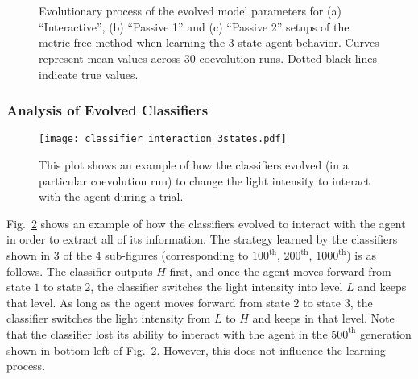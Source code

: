 \begin{figure}[!t]%
	\centering
		\\
		\\
		\caption{Evolutionary process of the evolved model parameters for (a) ``Interactive'', (b) ``Passive 1'' and (c) ``Passive 2'' setups of the metric-free method when learning the 3-state agent behavior. Curves represent mean values across 30 coevolution runs. Dotted black lines indicate true values.\label{fig:model_parameters_convergence_stochastic_3states}}
\end{figure}

\subsubsection{Analysis of Evolved Classifiers}
%
\begin{figure}[!t]
\centering
\texttt{[image: classifier\_interaction\_3states.pdf]}
\caption{This plot shows an example of how the classifiers evolved (in a particular coevolution run) to change the light intensity to interact with the agent during a trial.}
\label{fig:classifier_interaction_3states}
\end{figure}
%

Fig.~\ref{fig:classifier_interaction_3states} shows an example of how the classifiers evolved to interact with the agent in order to extract all of its information. The strategy learned by the classifiers shown in 3 of the 4 sub-figures (corresponding to $100^\mathrm{th}$, $200^\mathrm{th}$, $1000^\mathrm{th}$) is as follows. The classifier outputs $H$ first, and once the agent moves forward from state $1$ to state $2$, the classifier switches the light intensity into level $L$ and keeps that level. As long as the agent moves forward from state $2$ to state $3$, the classifier switches the light intensity from $L$ to $H$ and keeps in that level. Note that the classifier lost its ability to interact with the agent in the $500^\mathrm{th}$ generation shown in bottom left of Fig.~\ref{fig:classifier_interaction_3states}. However, this does not influence the learning process. 

